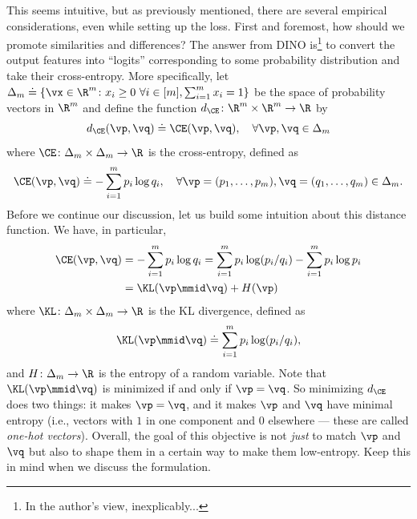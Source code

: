 \documentclass[../../book-main.tex]{subfiles}
\begin{document}
This seems intuitive, but as previously mentioned, there are several
empirical considerations, even while setting up the loss. First and
foremost, how should we promote similarities and differences? The
answer from DINO \citep{caron2021emerging} is\footnote{In the
author's view, inexplicably...} to convert the output features into
``logits'' corresponding to some probability distribution and take
their cross-entropy. More specifically, let \(\Delta_{m} \doteq \{\vx
        \in \R^{m} \colon x_{i} \geq 0\ \forall i \in [m], \sum_{i =
1}^{m}x_{i} = 1\}\) be the space of probability vectors in \(\R^{m}\)
and define the function \(d_{\CE} \colon \R^{m} \times \R^{m} \to \R\) by
\begin{equation}\label{eq:cross_entropy_difference}
    d_{\CE}(\vp, \vq) \doteq \CE(\vp, \vq), \quad \forall \vp, \vq
    \in \Delta_{m}
\end{equation}
where \(\CE \colon \Delta_{m} \times \Delta_{m} \to \R\) is the
cross-entropy, defined as
\begin{equation}\label{eq:expts_def_ce}
    \CE(\vp, \vq) \doteq -\sum_{i = 1}^{m}p_{i}\log q_{i}, \quad
    \forall \vp = (p_{1}, \dots, p_{m}), \vq = (q_{1}, \dots, q_{m})
    \in \Delta_{m}.
\end{equation}
Before we continue our discussion, let us build some intuition about
this distance function. We have, in particular,
\begin{align}
    \CE(\vp, \vq)
    &= -\sum_{i = 1}^{m}p_{i}\log q_{i} = \sum_{i = 1}^{m}p_{i}\log(p_{i}/q_{i})
    - \sum_{i = 1}^{m}p_{i}\log p_{i} \\
    &= \KL(\vp\mmid \vq) + H(\vp)
\end{align}
where \(\KL \colon \Delta_{m} \times \Delta_{m} \to \R\) is the KL
divergence, defined as
\begin{equation}
    \KL(\vp\mmid \vq) \doteq \sum_{i = 1}^{m}p_{i}\log(p_{i}/q_{i}),
\end{equation}
and \(H \colon \Delta_{m} \to \R\) is the entropy of a random variable. Note
that \(\KL(\vp\mmid \vq)\) is minimized if and only if \(\vp = \vq\).
So minimizing \(d_{\CE}\) does two things: it makes \(\vp = \vq\),
and it makes \(\vp\) and \(\vq\) have minimal entropy (i.e., vectors
    with \(1\) in one component and \(0\) elsewhere --- these are called
\textit{one-hot vectors}). Overall, the goal of this objective is not
\textit{just} to match \(\vp\) and \(\vq\) but also to shape them in
a certain way to make them low-entropy. Keep this in mind when we
discuss the formulation.
\end{document}
